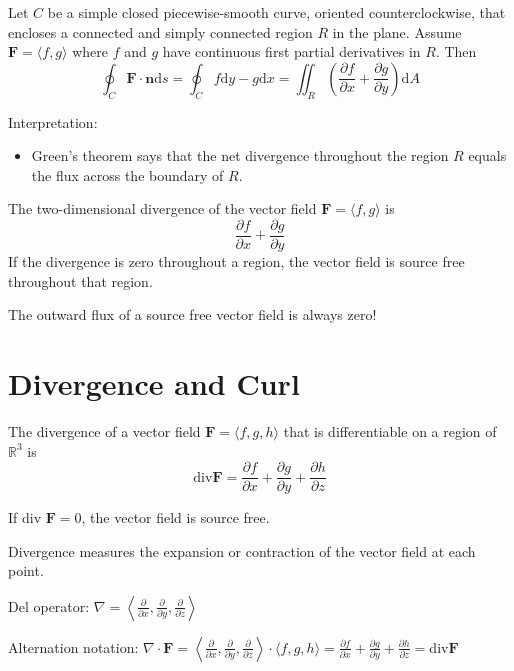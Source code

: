 \documentclass[../calc3.tex]{subfiles}
\begin{document}
\begin{theorem}
    Let $C$ be a simple closed piecewise-smooth curve, oriented counterclockwise, that encloses a connected and simply connected region $R$ in the plane.
    Assume $\textbf{F}=\langle f,g\rangle$ where $f$ and $g$ have continuous first partial derivatives in $R$. Then 
    \[\oint_C \textbf{F}\cdot\textbf{n}\mathrm{d}s=\oint_C f\mathrm{d}y-g\mathrm{d}x=\iint_R \left(\frac{\partial f}{\partial x}+\frac{\partial g}{\partial y}\right)\mathrm{d}A\]
\end{theorem}
Interpretation: 
\begin{itemize}
    \item Green's theorem says that the net divergence throughout the region $R$ equals the flux across the boundary of $R$.
\end{itemize}

\begin{definition}
    The two-dimensional divergence of the vector field $\textbf{F}=\langle f,g\rangle$ is 
    \[\frac{\partial f}{\partial x}+\frac{\partial g}{\partial y}\]
    If the divergence is zero throughout a region, the vector field is source free throughout that region.
\end{definition}

The outward flux of a source free vector field is always zero!



\section{Divergence and Curl}
\begin{definition}[Divergence]
    The divergence of a vector field $\textbf{F}=\langle f,g,h\rangle$ that is differentiable on a region of $\mathbb{R}^3$ is 
    \[\text{div} \textbf{F} =\frac{\partial f}{\partial x}+\frac{\partial g}{\partial y}+\frac{\partial h}{\partial z}\]

    If div $\textbf{F}=0$, the vector field is source free. 

    Divergence measures the expansion or contraction of the vector field at each point.

    Del operator: $\nabla = \left\langle\frac{\partial}{\partial x},\frac{\partial}{\partial y},\frac{\partial}{\partial z} \right\rangle$

    Alternation notation: $\nabla \cdot \textbf{F} = \left\langle\frac{\partial}{\partial x},\frac{\partial}{\partial y},\frac{\partial}{\partial z} \right\rangle \cdot \langle f,g,h\rangle = \frac{\partial f}{\partial x}+\frac{\partial g}{\partial y}+\frac{\partial h}{\partial z} = \text{div} \textbf{F}$
\end{definition}
\end{document}

